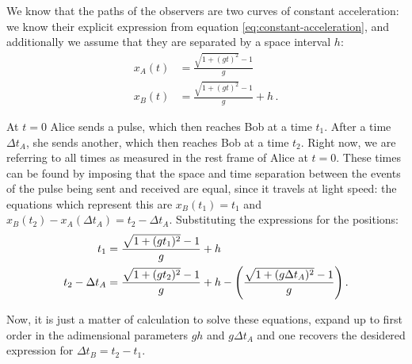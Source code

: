 \documentclass[main.tex]{subfiles}
\begin{document}
We know that the paths of the observers are two curves of constant acceleration: we know their explicit expression from equation \eqref{eq:constant-acceleration}, and additionally we assume that they are separated by a space interval \(h\): 
%
\begin{subequations}
\begin{align}
  x_A(t) &= \frac{\sqrt{1 + (gt)^2} -1}{g} \\ 
  x_B(t) &= \frac{\sqrt{1 + (gt)^2} -1}{g} + h
  \,.
\end{align}
\end{subequations}

At \(t=0\) Alice sends a pulse, which then reaches Bob at a time \(t_1\). After a time \(\Delta t_A\), she sends another, which then reaches Bob at a time \(t_2 \). 
Right now, we are referring to all times as measured in the rest frame of Alice at \(t=0\).
These times can be found by imposing that the space and time separation between the events of the pulse being sent and received are equal, since it travels at light speed: the equations which represent this are \(x_B(t_1) = t_1\) and \(x_B(t_2 ) -x_A (\Delta t_A) = t_2 - \Delta t_A\). Substituting the expressions for the positions:
%
\begin{subequations}
\begin{align}
  t_1 &= \frac{\sqrt{1+(g t_1 )^2} -1}{g} +h \\
  t_2 - \Delta t_A &= \frac{\sqrt{1+(gt_2 )^2} -1}{g} + h - \qty(\frac{\sqrt{1+(g \Delta t_A )^2} -1}{g})\,.
\end{align}
\end{subequations}

Now, it is just a matter of calculation to solve these equations, expand up to first order in the adimensional parameters \(gh\) and \(g \Delta t_A\) and one recovers the desidered expression for  \(\Delta t_B = t_2 - t_1\).
\end{document}
